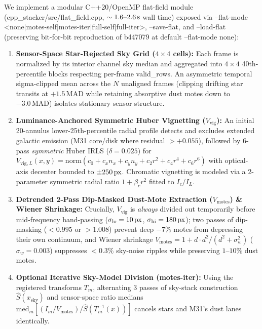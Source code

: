 \documentclass[10pt,twocolumn,letterpaper]{article}
\DeclareRobustCommand{\code}[1]{\texttt{#1}}
\def\code#1{#1}%
\def\bm#1{#1}%
\def\allowbreak{}%
\begin{document}
We implement a modular C++20/OpenMP flat-field module (\code{cpp\_stacker/\allowbreak src/\allowbreak flat\_field.cpp}, $\sim 1.6\text{--}2.6\text{\,s}$ wall time) exposed via \code{--flat-mode} \code{<none|\allowbreak motes-self|\allowbreak motes-iter|\allowbreak full-self|\allowbreak full-iter>}, \code{--save-flat}, and \code{--load-flat} (preserving bit-for-bit reproduction of \code{b447079} at default \code{--flat-mode none}):
\begin{enumerate}
  \item \textbf{Sensor-Space Star-Rejected Sky Grid ($4\times 4$ cells):} Each frame is normalized by its interior channel sky median and aggregated into $4\times 4$ 40th-percentile blocks respecting per-frame \code{valid\_rows}. An asymmetric temporal sigma-clipped mean across the $N$ unaligned frames (clipping drifting star transits at $+1.5\,\text{MAD}$ while retaining absorptive dust motes down to $-3.0\,\text{MAD}$) isolates stationary sensor structure.
  \item \textbf{Luminance-Anchored Symmetric Huber Vignetting ($V_{\text{vig}}$):} An initial 20-annulus lower-25th-percentile radial profile detects and excludes extended galactic emission (M31 core/disk where residual $> +0.055$), followed by 6-pass \emph{symmetric} Huber IRLS ($\delta = 0.025$) for $V_{\text{vig},L}(x, y) = \text{norm}(c_0 + c_x n_x + c_y n_y + c_2 r^2 + c_4 r^4 + c_6 r^6)$ with optical-axis decenter bounded to $\pm 250\text{\,px}$. Chromatic vignetting is modeled via a 2-parameter symmetric radial ratio $1 + \beta_c r^2$ fitted to $I_c / I_L$.
  \item \textbf{Detrended 2-Pass Dip-Masked Dust-Mote Extraction ($V_{\text{motes}}$) \& Wiener Shrinkage:} Crucially, $V_{\text{vig}}$ is \emph{always} divided out temporarily before mid-frequency band-passing ($\sigma_{\text{lo}} = 10\text{\,px}$, $\sigma_{\text{hi}} = 180\text{\,px}$); two passes of dip-masking ($< 0.995$ or $> 1.008$) prevent deep $-7\%$ motes from depressing their own continuum, and Wiener shrinkage $V_{\text{motes}} = 1 + d \cdot d^2/(d^2 + \sigma_w^2)$ ($\sigma_w = 0.003$) suppresses $<0.3\%$ sky-noise ripples while preserving $1\text{--}10\%$ dust motes.
  \item \textbf{Optional Iterative Sky-Model Division (\code{motes-iter}):} Using the registered transforms $T_m$, alternating 3 passes of sky-stack construction $\hat{S}(\bm{x}_{\text{sky}})$ and sensor-space ratio medians $\text{med}_m\![(I_m / V_{\text{motes}}) / \hat{S}(T_m^{-1}(\bm{x}))]$ cancels stars and M31's dust lanes identically.
\end{enumerate}
\end{document}
